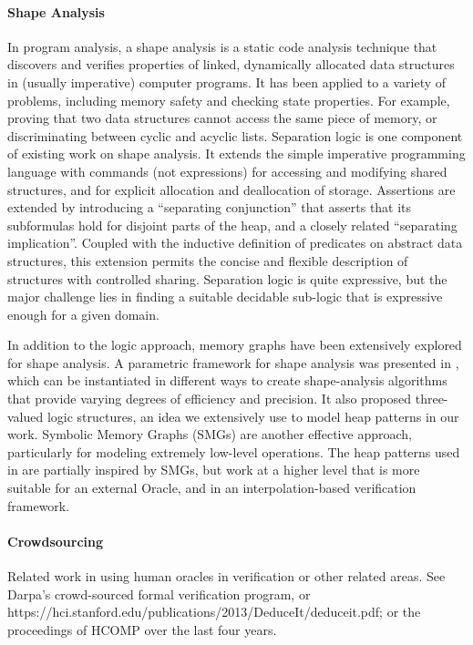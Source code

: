 \paragraph{Shape Analysis}
In program analysis, a shape analysis is a static code analysis technique that discovers and verifies properties of linked, dynamically allocated data structures in (usually imperative) computer programs. It has been applied to a variety of problems, including memory safety and checking state properties. For example, proving that two data structures cannot access the same piece of memory, or discriminating between cyclic and acyclic lists. Separation logic \cite{calcagano11,reynolds02} is one component of existing work on shape analysis. It extends the simple imperative programming language with commands (not expressions) for accessing and modifying shared structures, and for explicit allocation and deallocation of storage. Assertions are extended by introducing a ``separating conjunction'' that asserts that its subformulas hold for disjoint parts of the heap, and a closely related ``separating implication''. Coupled with the inductive definition of predicates on abstract data structures, this extension permits the concise and flexible description of
structures with controlled sharing. Separation logic is quite expressive, but the major challenge lies in finding a suitable decidable sub-logic that is expressive enough for a given domain.

In addition to the logic approach, memory graphs have been extensively explored for shape analysis. A parametric framework for shape analysis was presented in \cite{sagiv02}, which can be instantiated in different ways to create shape-analysis algorithms that provide varying degrees of efficiency and precision. It also proposed three-valued logic structures, an idea we extensively use to model heap patterns in our work. Symbolic Memory Graphs (SMGs) \cite{dudka13} are another effective approach, particularly for modeling extremely low-level operations. The heap patterns used in \verifier are partially inspired by SMGs, but work at a higher level that is more suitable for an external Oracle, and in an interpolation-based verification framework.

\paragraph{Crowdsourcing}
Related work in using human oracles in verification or other related areas. See Darpa's crowd-sourced formal verification program, or https://hci.stanford.edu/publications/2013/DeduceIt/deduceit.pdf; or the proceedings of HCOMP over the last four years. \cite{wenchao2012}

